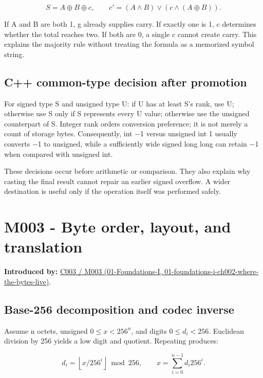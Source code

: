 \[
S=A\oplus B\oplus c,\qquad c'=(A\land B)\lor(c\land(A\oplus B)).
\]

If A and B are both 1, g already supplies carry. If exactly one is 1, c determines whether the total reaches two. If both are 0, a single c cannot create carry. This explains the majority rule without treating the formula as a memorized symbol string.

\subsection{C++ common-type decision after promotion}\label{03-visual-computing-i-ch018-c-common-type-decision-after-promotion}

For signed type S and unsigned type U: if U has at least S's rank, use U; otherwise use S only if S represents every U value; otherwise use the unsigned counterpart of S. Integer rank orders conversion preference; it is not merely a count of storage bytes. Consequently, int −1 versus unsigned int 1 usually converts −1 to unsigned, while a sufficiently wide signed long long can retain −1 when compared with unsigned int.

These decisions occur before arithmetic or comparison. They also explain why casting the final result cannot repair an earlier signed overflow. A wider destination is useful only if the operation itself was performed safely.

\section{M003 - Byte order, layout, and translation}\label{03-visual-computing-i-ch018-m003---byte-order-layout-and-translation}

\textbf{Introduced by:} \href{../01-Foundations-I/main.pdf\#nameddest=01-foundations-i-ch002-where-the-bytes-live}{C003 / M003 (01-Foundations-I, 01-foundations-i-ch002-where-the-bytes-live)}.

\subsection{Base-256 decomposition and codec inverse}\label{03-visual-computing-i-ch018-base-256-decomposition-and-codec-inverse}

Assume n octets, unsigned \(0\le x<256^n\), and digits \(0\le d_i<256\). Euclidean division by 256 yields a low digit and quotient. Repeating produces:

\[
d_i=\left\lfloor x/256^i\right\rfloor\bmod256,\qquad
x=\sum_{i=0}^{n-1}d_i256^i.
\]

